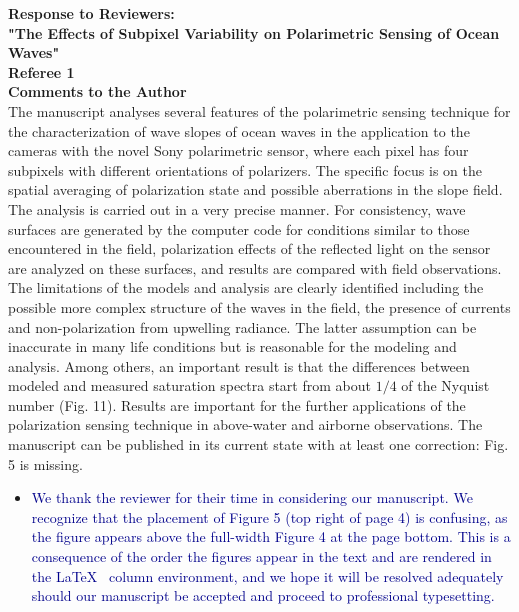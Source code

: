 \documentclass[14pt,letterpaper]{article}
\begin{document}
\noindent  \textbf{Response to Reviewers:\\ "The Effects of Subpixel Variability on Polarimetric Sensing of Ocean Waves"}\\

\noindent \textbf{Referee 1}\\

\textbf{Comments to the Author}\\
The manuscript analyses several features of the polarimetric sensing technique for the characterization of wave slopes of ocean waves in the application to the cameras with the novel Sony polarimetric sensor, where each pixel has four subpixels with different orientations of polarizers. The specific focus is on the spatial averaging of polarization state and possible aberrations in the slope field. The analysis is carried out in a very precise manner. For consistency, wave surfaces are generated by the computer code for conditions similar to those encountered in the field, polarization effects of the reflected light on the sensor are analyzed on these surfaces, and results are compared with field observations. The limitations of the models and analysis are clearly identified including the possible more complex structure of the waves in the field, the presence of currents and non-polarization from upwelling radiance. The latter assumption can be inaccurate in many life conditions but is reasonable for the modeling and analysis. Among others, an important result is that the differences between modeled and measured saturation spectra start from about $1/4$ of the Nyquist number (Fig. 11). Results are important for the further applications of the polarization sensing technique in above-water and airborne observations.
The manuscript can be published in its current state with at least one correction: Fig. 5 is missing.
\begin{itemize}
    \item \textcolor{darkblue}{We thank the reviewer for their time in considering our manuscript. We recognize that the placement of Figure 5 (top right of page 4) is confusing, as the figure appears above the full-width Figure 4 at the page bottom. This is a consequence of the order the figures appear in the text and are rendered in the \LaTeX~\hspace{-3pt} column environment, and we hope it will be resolved adequately should our manuscript be accepted and proceed to professional typesetting.}
\end{itemize}
\end{document}
